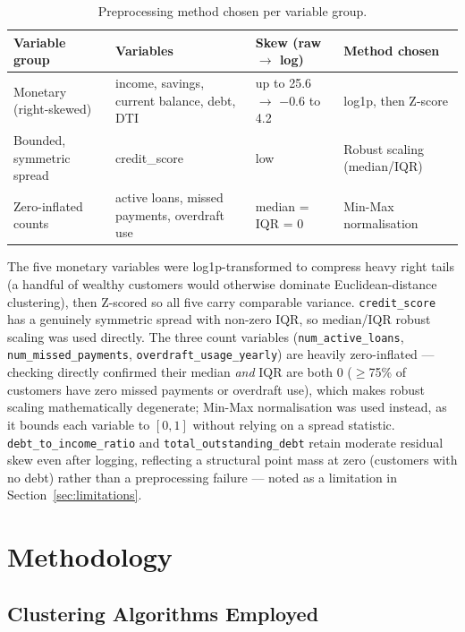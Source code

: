 \documentclass[11pt]{article}
\begin{document}
\begin{table}[h]
\centering
\small
\begin{tabular}{L{3.1cm} L{4.3cm} L{2.6cm} L{3.2cm}}
\toprule
\textbf{Variable group} & \textbf{Variables} & \textbf{Skew (raw $\to$ log)} & \textbf{Method chosen} \\
\midrule
Monetary (right-skewed) & income, savings, current balance, debt, DTI & up to 25.6 $\to$ $-0.6$ to 4.2 & log1p, then Z-score \\
Bounded, symmetric spread & credit\_score & low & Robust scaling (median/IQR) \\
Zero-inflated counts & active loans, missed payments, overdraft use & median = IQR = 0 & Min-Max normalisation \\
\bottomrule
\end{tabular}
\caption{Preprocessing method chosen per variable group.}
\end{table}

The five monetary variables were log1p-transformed to compress heavy right tails (a handful of wealthy customers would otherwise dominate Euclidean-distance clustering), then Z-scored so all five carry comparable variance. \texttt{credit\_score} has a genuinely symmetric spread with non-zero IQR, so median/IQR robust scaling was used directly. The three count variables (\texttt{num\_active\_loans}, \texttt{num\_missed\_payments}, \texttt{overdraft\_usage\_yearly}) are heavily zero-inflated --- checking directly confirmed their median \emph{and} IQR are both 0 ($\geq$75\% of customers have zero missed payments or overdraft use), which makes robust scaling mathematically degenerate; Min-Max normalisation was used instead, as it bounds each variable to $[0,1]$ without relying on a spread statistic. \texttt{debt\_to\_income\_ratio} and \texttt{total\_outstanding\_debt} retain moderate residual skew even after logging, reflecting a structural point mass at zero (customers with no debt) rather than a preprocessing failure --- noted as a limitation in Section~\ref{sec:limitations}.

\section{Methodology}

\subsection{Clustering Algorithms Employed}
\end{document}
